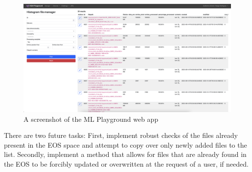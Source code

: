 \begin{figure}
	\centering
	\includegraphics*[width=\linewidth,trim = 1cm 5.2in 13.6in 0]{Images/MLP.png}
	\caption{A screenshot of the ML Playground web app}
	\label{fig:MLplayground}
\end{figure}


There are two future tasks: First, implement robust checks of the files already present in the EOS space and attempt to copy over only newly added files to the list.
Secondly, implement a method that allows for files that are already found in the EOS to be forcibly updated or overwritten at the request of a user, if needed.

